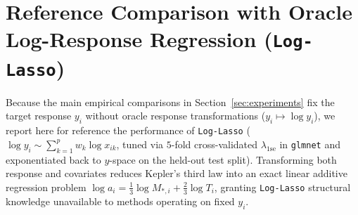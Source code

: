 \documentclass[11pt,a4paper]{article}
\begin{document}
\section{Reference Comparison with Oracle Log-Response Regression (\texttt{Log-Lasso})}
\label{app:log_lasso}

Because the main empirical comparisons in Section~\ref{sec:experiments} fix the target response $y_i$ without oracle response transformations ($y_i \mapsto \log y_i$), we report here for reference the performance of \texttt{Log-Lasso} ($\log y_i \sim \sum_{k=1}^p w_k \log x_{ik}$, tuned via $5$-fold cross-validated $\lambda_{\text{1se}}$ in \texttt{glmnet} and exponentiated back to $y$-space on the held-out test split). Transforming both response and covariates reduces Kepler's third law into an exact linear additive regression problem $\log a_i = \frac{1}{3} \log M_{*,i} + \frac{2}{3} \log T_i$, granting \texttt{Log-Lasso} structural knowledge unavailable to methods operating on fixed $y_i$.

\begin{table}[htbp]
\centering
\caption{Archived $100$-seed performance (Mean and SD) of oracle log-response \texttt{Log-Lasso} on Synthetic Kepler and the NASA Exoplanet Archive compared against fixed-$y$ \texttt{Lasso} and \texttt{Symbolic-LBBNN}.}
\label{tab:log_lasso_ref}
\end{table}
\end{document}
